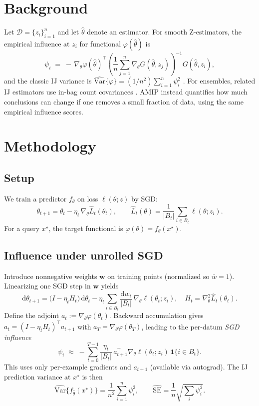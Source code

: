 \documentclass[11pt]{article}
\begin{document}
\section{Background}
Let $\mathcal{D}=\{z_i\}_{i=1}^n$ and let $\hat\theta$ denote an estimator. For smooth Z-estimators, the empirical influence at $z_i$ for functional $\varphi(\hat\theta)$ is
\begin{equation}
\psi_i \;=\; -\,\nabla_\theta \varphi(\hat\theta)^\top \left(\frac{1}{n}\sum_{j=1}^n \nabla_\theta G(\hat\theta,z_j)\right)^{-1} G(\hat\theta,z_i),
\label{eq:classicIF}
\end{equation}
and the classic IJ variance is $\widehat{\mathrm{Var}}\{\varphi\}=(1/n^2)\sum_{i=1}^n \psi_i^2$ \citep{efron1982jackknife}. For ensembles, related IJ estimators use in-bag count covariances \citep{wager2014jackknife,athey2019grf}. AMIP \citep{broderick2023amip} instead quantifies how much conclusions can change if one removes a small fraction of data, using the same empirical influence scores.

\section{Methodology}
\subsection{Setup}
We train a predictor $f_\theta$ on loss $\ell(\theta;z)$ by SGD:
\[
\theta_{t+1}=\theta_t-\eta_t\,\nabla_\theta \widehat{L}_t(\theta_t),\qquad
\widehat{L}_t(\theta)=\frac{1}{|B_t|}\sum_{i\in B_t}\ell(\theta;z_i).
\]
For a query $x^\star$, the target functional is $\varphi(\theta)=f_\theta(x^\star)$.

\subsection{Influence under unrolled SGD}
Introduce nonnegative weights $\mathbf{w}$ on training points (normalized so $\bar w=1$). Linearizing one SGD step in $\mathbf{w}$ yields
\[
\mathrm{d}\theta_{t+1}=\big(I-\eta_t H_t\big)\,\mathrm{d}\theta_t
-\eta_t\sum_{i\in B_t}\frac{\mathrm{d}w_i}{|B_t|}\,\nabla_\theta \ell(\theta_t;z_i),
\quad H_t=\nabla_\theta^2 \widehat{L}_t(\theta_t).
\]
Define the adjoint $a_t:=\nabla_\theta \varphi(\theta_t)$. Backward accumulation gives
$a_t=(I-\eta_t H_t)^\top a_{t+1}$ with $a_T=\nabla_\theta \varphi(\theta_T)$, leading to the per-datum \emph{SGD influence}
\begin{equation}
\psi_i \;\approx\; -\sum_{t=0}^{T-1}\frac{\eta_t}{|B_t|}\,a_{t+1}^\top\nabla_\theta \ell(\theta_t;z_i)\,\mathbf{1}\{i\in B_t\}.
\label{eq:sgdIF}
\end{equation}
This uses only per-example gradients and $a_{t+1}$ (available via autograd). The IJ prediction variance at $x^\star$ is then
\begin{equation}
\widehat{\mathrm{Var}}\{f_{\hat\theta}(x^\star)\}=\frac{1}{n^2}\sum_{i=1}^n \psi_i^2,\qquad
\widehat{\mathrm{SE}}=\frac{1}{n}\sqrt{\sum_i \psi_i^2}.
\label{eq:ijvar}
\end{equation}
\end{document}

